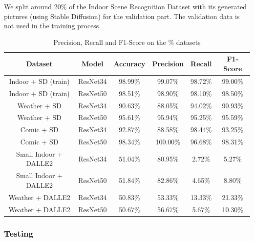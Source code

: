 \documentclass[11pt]{article}
\begin{document}
We split around 20\% of the Indoor Scene Recognition Dataset with its generated pictures (using Stable Diffusion) for the validation part. The validation data is not used in the training process.
\begin{table}
  \centering
  \begin{tabular}{c|c||c|c|c|c}
    \hline
    \textbf{Dataset}      & \textbf{Model} & \textbf{Accuracy} & \textbf{Precision} & \textbf{Recall} & \textbf{F1-Score} \\
    \hline
    Indoor + SD (train)   & ResNet34       & {98.99\%}         & {99.07\%}          & {98.72\%}       & {99.00\%}         \\
    Indoor + SD (train)   & ResNet50       & {98.51\%}         & {98.90\%}          & {98.10\%}       & {98.50\%}         \\
    \hline
    Weather + SD          & ResNet34       & {90.63\%}         & {88.05\%}          & {94.02\%}       & {90.93\%}         \\
    Weather + SD          & ResNet50       & {95.61\%}         & {95.94\%}          & {95.25\%}       & {95.59\%}         \\
    Comic + SD            & ResNet34       & {92.87\%}         & {88.58\%}          & {98.44\%}       & {93.25\%}         \\
    Comic + SD            & ResNet50       & {98.34\%}         & {100.00\%}         & {96.68\%}       & {98.31\%}         \\
    Small Indoor + DALLE2 & ResNet34       & {51.04\%}         & {80.95\%}          & {2.72\%}        & {5.27\%}          \\
    Small Indoor + DALLE2 & ResNet50       & {51.84\%}         & {82.86\%}          & {4.65\%}        & {8.80\%}          \\
    Weather + DALLE2      & ResNet34       & {50.83\%}         & {53.33\%}          & {13.33\%}       & {21.33\%}         \\
    Weather + DALLE2      & ResNet50       & {50.67\%}         & {56.67\%}          & {5.67\%}        & {10.30\%}         \\
    \hline
  \end{tabular}
  \caption{Precision, Recall and F1-Score on the \% datasets}
  \label{tab:results-on-datasets}
\end{table}

\subsubsection{Testing}
\end{document}

